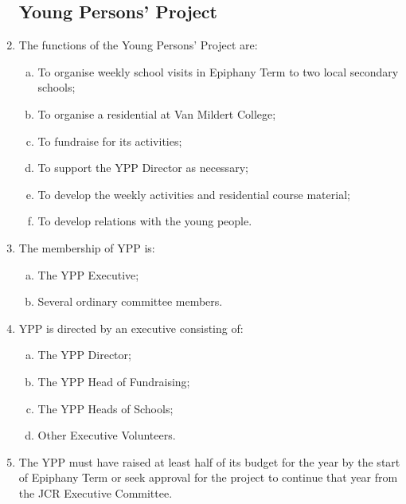 \documentclass[12pt]{article}
\begin{document}
\begin{enumerate}
    \subsection{Young Persons' Project}
    \item The functions of the Young Persons' Project are:
    \begin{enumerate}[(a)]
        \item To organise weekly school visits in Epiphany Term to two local secondary schools;
        \item To organise a residential at Van Mildert College;
        \item To fundraise for its activities;
        \item To support the YPP Director as necessary;
        \item To develop the weekly activities and residential course material;
        \item To develop relations with the young people.
    \end{enumerate}
    \item The membership of YPP is:
    \begin{enumerate}[(a)]
        \item The YPP Executive;
        \item Several ordinary committee members.
    \end{enumerate}
		\item YPP is directed by an executive consisting of:
    \begin{enumerate}[(a)]
        \item The YPP Director;
        \item The YPP Head of Fundraising;
        \item The YPP Heads of Schools;
        \item Other Executive Volunteers.
    \end{enumerate}
    \item The YPP must have raised at least half of its budget for the year by the start of Epiphany Term or seek approval for the project to continue that year from the JCR Executive Committee.
    

\end{enumerate}
\end{document}
